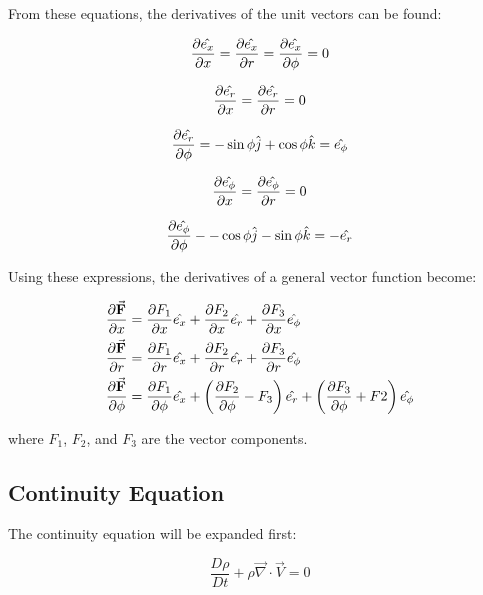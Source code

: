 From these equations, the derivatives of the unit vectors can be found:

\begin{equation}
    \pdv{\hat{e_x}}{x} 
  = \pdv{\hat{e_x}}{r} 
  = \pdv{\hat{e_x}}{\phi} = 0
\end{equation}

\begin{equation}
  \pdv{\hat{e_r}}{x} = \pdv{\hat{e_r}}{r} = 0
\end{equation}

\begin{equation}
  \pdv{\hat{e_r}}{\phi} = 
  - \sin\phi\hat{j} 
  + \cos\phi\hat{k} = \hat{e_\phi}
\end{equation}

\begin{equation}
  \pdv{\hat{e_\phi}}{x}
  = \pdv{\hat{e_\phi}}{r} = 0
\end{equation}

\begin{equation}
  \pdv{\hat{e_\phi}}{\phi} - -\cos{\phi}\hat{j} - \sin{\phi}\hat{k} = -\hat{e_r}
\end{equation}


Using these expressions, the derivatives of a general vector function become:

\begin{equation}
  \begin{aligned}
    \pdv{\va{F}}{x} &= 
    \pdv{F_1}{x}\hat{e_x} + 
    \pdv{F_2}{x}\hat{e_r} + 
    \pdv{F_3}{x}\hat{e_\phi} \\
    \pdv{\va{F}}{r} &= 
    \pdv{F_1}{r}\hat{e_x} + 
    \pdv{F_2}{r}\hat{e_r} + 
    \pdv{F_3}{r}\hat{e_\phi} \\
    \pdv{\va{F}}{\phi} &= 
    \pdv{F_1}{\phi}\hat{e_x} + 
    \left(\pdv{F_2}{\phi} - F_3\right)\hat{e_r} + 
    \left(\pdv{F_3}{\phi} + F2\right)\hat{e_\phi}
  \end{aligned}
\end{equation}

where $F_1$, $F_2$, and $F_3$ are the vector components.

\subsection{Continuity Equation}

The continuity equation will be expanded first:

\begin{equation}
\frac{D\rho}{Dt} 
  + \rho \overrightarrow{\nabla}\cdot\overrightarrow{V} = 0
\end{equation}

